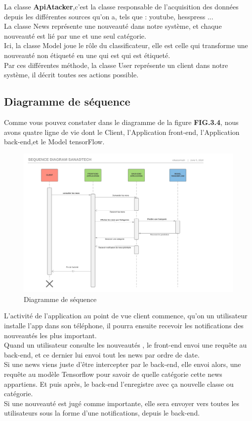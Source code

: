 La classe \textbf{ApiAtacker},c'est la classe responsable de l'acquisition des données depuis les différentes sources qu'on a, tels que : youtube, hesspress ...\\[0.2cm]
La classe News représente une nouveauté dans notre système, et chaque nouveauté est lié par une et une seul catégorie.\\[0.2cm]
Ici, la classe Model joue le rôle du classificateur, elle est celle qui transforme une nouveauté non étiqueté en une qui est qui est  étiqueté.\\[0.2cm]
Par ces différentes méthode, la classe User représente un client dans notre système, il décrit toutes ses actions possible.

\subsection{Diagramme de séquence}
Comme vous pouvez constater dans le diagramme de la figure \textbf{FIG.3.4}, nous avons quatre ligne de vie dont le  Client, l'Application front-end, l'Application back-end,et le  Model tensorFlow.
\begin{figure}[H]
	\includegraphics[scale=0.70]{Images/Sequence_Diagram_Sanadtech.png}
	\caption{Diagramme de séquence}
	\label{fig:sequence}
\end{figure}
L'activité de l'application au point de vue client commence, qu'on un utilisateur installe l'app dans son téléphone, il pourra ensuite recevoir les notifications des nouveautés les plus important.\\[0.2cm]
Quand un utilisateur consulte les nouveautés , le front-end envoi une requête au back-end, et ce dernier lui envoi tout les news par ordre de date.\\[0.2cm]
Si une news viens juste d'être intercepter par le back-end, elle envoi alors, une requête au modèle Tensorflow pour savoir de quelle catégorie cette news appartiens. Et puis après, le back-end l'enregistre avec ça nouvelle classe ou catégorie.\\[0.4cm]
Si une nouveauté est jugé comme importante, elle sera envoyer vers toutes les utilisateurs sous la forme d'une notifications, depuis le back-end.\\[0.2cm]

